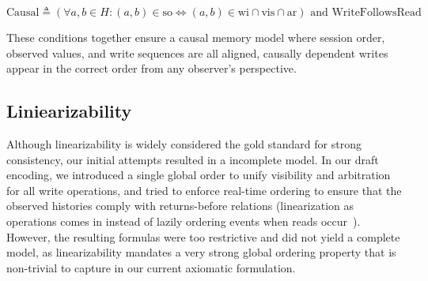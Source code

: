 $$
  \text{Causal} \triangleq (\forall a, b \in H: (a, b) \in \text{so} \Leftrightarrow (a, b) \in \text{wi} \cap \text{vis} \cap \text{ar}) \text{ and } \text{WriteFollowsRead}
$$

These conditions together ensure a causal memory model where session order,
observed values, and write sequences are all aligned, causally dependent writes
appear in the correct order from any observer's perspective.

\subsection{Liniearizability}

Although linearizability is widely considered the gold standard for strong
consistency, our initial attempts resulted in a incomplete model. In our draft
encoding, we introduced a single global order to unify visibility and
arbitration for all write operations, and tried to enforce real-time ordering to
ensure that the observed histories comply with returns-before relations
(linearization as operations comes in instead of lazily ordering events when
reads occur~\cite{zhang2018building}). However, the resulting formulas were too
restrictive and did not yield a complete model, as linearizability mandates a
very strong global ordering property that is non-trivial to capture in our
current axiomatic formulation.
